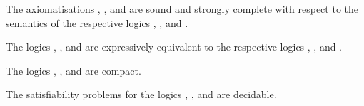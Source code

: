 \begin{proposition}
The axiomatisations \axiomAmlK{}, \axiomAmlKFF{}, and \axiomAmlS{} are sound and strongly complete with respect to the semantics of the respective logics \logicAmlK{}, \logicAmlKFF{}, and \logicAmlS{}.
\end{proposition}

\begin{proposition}\label{aml-expressive-equivalence}
The logics \logicAmlK{}, \logicAmlKFF{}, and \logicAmlS{} are expressively equivalent to the respective logics \logicK{}, \logicKFF{}, and \logicS{}.
\end{proposition}

\begin{proposition}
The logics \logicAmlK{}, \logicAmlKFF{}, and \logicAmlS{} are compact.
\end{proposition}

\begin{proposition}
The satisfiability problems for the logics \logicAmlK{}, \logicAmlKFF{}, and \logicAmlS{} are decidable.
\end{proposition}
